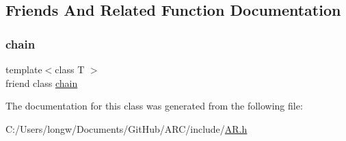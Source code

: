 \subsection{Friends And Related Function Documentation}
\hypertarget{classARC_1_1chainpars_a498fbb4337b9878a5f0044996e4a2489}{}\label{classARC_1_1chainpars_a498fbb4337b9878a5f0044996e4a2489} 
\subsubsection{\texorpdfstring{chain}{chain}}
{\footnotesize\ttfamily template$<$class T $>$ \\
friend class \hyperlink{classARC_1_1chain}{chain}\hspace{0.3cm}{\ttfamily [friend]}}



The documentation for this class was generated from the following file\+:\begin{DoxyCompactItemize}
\item 
C\+:/\+Users/longw/\+Documents/\+Git\+Hub/\+A\+R\+C/include/\hyperlink{AR_8h}{A\+R.\+h}\end{DoxyCompactItemize}
